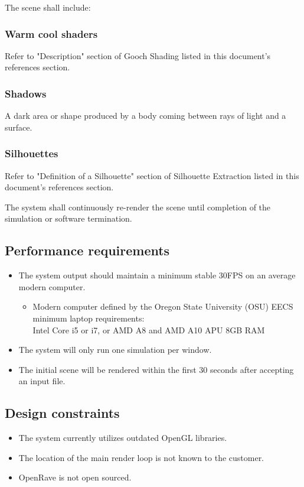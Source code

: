 \documentclass[10pt,journal,compsoc]{IEEEtran}
\begin{document}
\begin{flushleft}
\vspace{3mm}

The scene shall include:
\subsubsection{Warm cool shaders}
Refer to "Description" section of Gooch Shading listed in this document's references section.

\subsubsection{Shadows}
A dark area or shape produced by a body coming between rays of light and a surface.

\subsubsection{Silhouettes}
Refer to "Definition of a Silhouette" section of Silhouette Extraction listed in this document's references section.

\vspace{3mm}
The system shall continuously re-render the scene until completion of the simulation or software termination.

\subsection{Performance requirements}
\vspace{3mm}
\begin{itemize}
\item The system output should maintain a minimum stable 30FPS on an average modern computer.
\begin{itemize}
\item Modern computer defined by the Oregon State University (OSU) EECS minimum laptop requirements: \\
Intel Core i5 or i7, or AMD A8 and AMD A10 APU
8GB RAM

\end{itemize}
\item The system will only run one simulation per window.
\item The initial scene will be rendered within the first 30 seconds after accepting an input file.
\end{itemize}

\subsection{Design constraints}
\vspace{3mm}
\begin{itemize}
\item The system currently utilizes outdated OpenGL libraries.
\item The location of the main render loop is not known to the customer.
\item OpenRave is not open sourced.
\end{itemize}



\end{flushleft}
\end{document}
